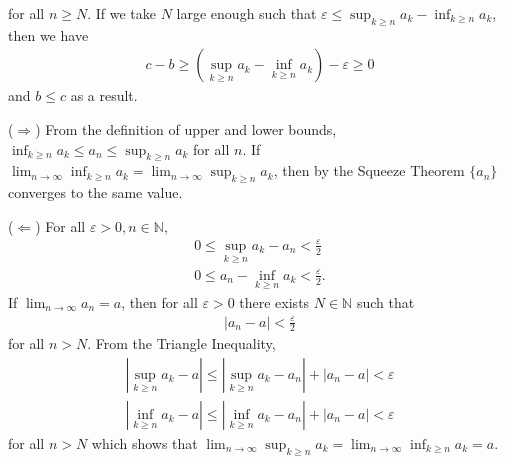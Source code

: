 \documentclass[a4paper,12pt]{article}
\begin{document}
\begin{enumerate}
            for all $n \geq N$. If we take $N$ large enough such that $\varepsilon \leq \sup_{k \geq n} a_k - \inf_{k \geq n} a_k$, then we have
            \begin{align*}
                c - b \geq (\sup_{k \geq n} a_k - \inf_{k \geq n} a_k) - \varepsilon \geq 0
            \end{align*}
            and $b \leq c$ as a result. \par
            ($\Rightarrow$) From the definition of upper and lower bounds, $\inf_{k \geq n} a_k \leq a_n \leq \sup_{k \geq n} a_k$ for all $n$. If $\lim_{n \to \infty} \inf_{k \geq n} a_k = \lim_{n \to \infty} \sup_{k \geq n} a_k$, then by the Squeeze Theorem $\{a_n\}$ converges to the same value. \par
            ($\Leftarrow$) For all $\varepsilon > 0, n \in \mathbb{N}$,
            \begin{gather*}
                0 \leq \sup_{k \geq n} a_k - a_n < \frac{\varepsilon}{2} \\
                0 \leq a_n - \inf_{k \geq n} a_k < \frac{\varepsilon}{2}.
            \end{gather*}
            If $\lim_{n \to \infty} a_n = a$, then for all $\varepsilon > 0$ there exists $N \in \mathbb{N}$ such that
            \begin{align*}
                |a_n - a| < \frac{\varepsilon}{2}
            \end{align*}
            for all $n > N$. From the Triangle Inequality,
            \begin{gather*}
                |\sup_{k \geq n} a_k - a| \leq |\sup_{k \geq n} a_k - a_n| + |a_n - a| < \varepsilon \\
                |\inf_{k \geq n} a_k - a| \leq |\inf_{k \geq n} a_k - a_n| + |a_n - a| < \varepsilon
            \end{gather*}
            for all $n > N$ which shows that $\lim_{n \to \infty} \sup_{k \geq n} a_k = \lim_{n \to \infty} \inf_{k \geq n} a_k = a$.


\end{enumerate}
\end{document}
